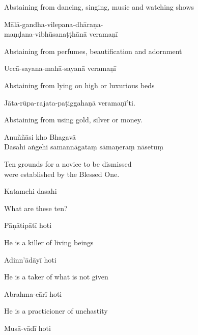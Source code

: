 \begin{english}
  Abstaining from dancing, singing, music and watching shows
\end{english}

Mālā-gandha-vilepana-dhāraṇa-\\
\vin maṇḍana-vibhūsanaṭṭhānā veramaṇī

\begin{english}
  Abstaining from perfumes, beautification and adornment
\end{english}

Uccā-sayana-mahā-sayanā veramaṇī

\begin{english}
  Abstaining from lying on high or luxurious beds
\end{english}

Jāta-rūpa-rajata-paṭiggahaṇā veramaṇī'ti.

\begin{english}
  Abstaining from using gold, silver or money.
\end{english}


Anuññāsi kho Bhagavā\\
Dasahi aṅgehi samannāgataṃ sāmaṇeraṃ nāsetuṃ

\begin{english}
  Ten grounds for a novice to be dismissed\\
  were established by the Blessed One.
\end{english}

Katamehi dasahi

\begin{english}
  What are these ten?
\end{english}

Pāṇātipātī hoti

\begin{english}
  He is a killer of living beings
\end{english}

Adinn'ādāyī hoti

\begin{english}
  He is a taker of what is not given
\end{english}

Abrahma-cārī hoti

\begin{english}
  He is a practicioner of unchastity
\end{english}

Musā-vādī hoti

